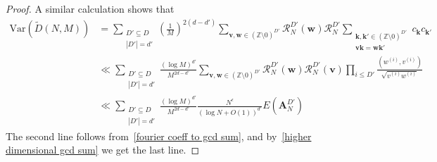 \documentclass[12pt,article]{amsart}
\theoremstyle{remark}
\numberwithin{equation}{section}
\newcommand{\Z}{\mathbb{Z}}
\newcommand{\Var}{\text{Var}}
\newcommand{\boldk}{\boldsymbol{k}}
\newcommand{\boldv}{\boldsymbol{v}}
\newcommand{\boldA}{\boldsymbol{A}}
\begin{document}
\begin{proof}
		A similar calculation shows that
		\begin{align*}
			\Var(\widetilde{D}(N,M))&=\sum_{\substack{D'\subseteq D\\|D'|=d'}}\left(\frac{1}{M}\right)^{2(d-d')}\sum_{\boldv,\boldsymbol{w}\in(\Z\setminus 0)^{D'}}\mathcal{R}_{N}^{D'}(\boldsymbol{w})\mathcal{R}_{N}^{D'}\sum_{\substack{\boldk,\boldk'\in(\Z\setminus0)^{D'}\\\boldv\boldk=\boldsymbol{w}\boldk'}}c_{\boldk}c_{\boldk'}\\
			&\ll\sum_{\substack{D'\subseteq D\\|D'|=d'}}\frac{(\log M)^{d'}}{M^{2d-d'}}\sum_{\boldv,\boldsymbol{w}\in(\Z\setminus 0)^{D'}}\mathcal{R}_{N}^{D'}(\boldsymbol{w})\mathcal{R}_{N}^{D'}(\boldv)\prod_{i\leq D'}\frac{(w^{(i)},v^{(i)})}{\sqrt{v^{(i)}w^{(i)}}}\\
			&\ll\sum_{\substack{D'\subseteq D\\|D'|=d'}}\frac{(\log M)^{d'}}{M^{2d-d'}}\frac{N^{\epsilon}}{(\log N+O(1))^{d'}}E(\boldA_N^{D'})
		\end{align*}
		The second line follows from~\eqref{fourier coeff to gcd sum}, and by~\eqref{higher dimensional gcd sum} we get the last line.
	\end{proof}
	
\end{document}
